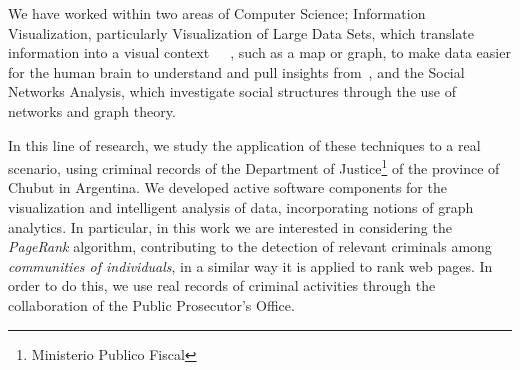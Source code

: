 We have worked within two areas of Computer Science; Information Visualization, particularly Visualization of Large Data Sets, which  translate information into a visual context~\cite{xu2005criminal}~\cite{feng2019big}~\cite{mathew2021criminal}, such as a map or graph, to make data easier for the human brain to understand and pull insights from~\cite{chen2005visualization}, and the Social  Networks Analysis, which investigate social structures through the use of networks and graph theory.


In this line of research, we study the application of these techniques to a real scenario, using criminal records of the Department of Justice\footnote{Ministerio Publico Fiscal} of the province of Chubut in Argentina. We developed active software components for the visualization and intelligent analysis of data, incorporating notions of graph analytics. In particular, in this work we are interested in considering the \textit{PageRank} algorithm, contributing to the detection of relevant criminals among \textit{communities of individuals}, in a similar way it is applied to rank web pages. In order to do this, we use real records of criminal activities through the collaboration of the Public Prosecutor's Office. 


